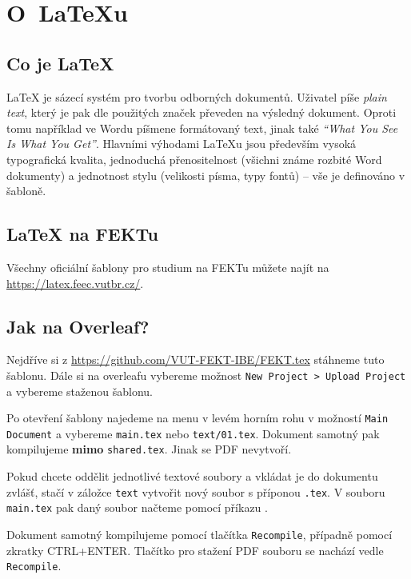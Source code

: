 \clearpage
\section[O~LaTeXu]{O~\LaTeX{}u}

\subsection{Co je \LaTeX}

\LaTeX{} je sázecí systém pro tvorbu odborných dokumentů.
Uživatel píše \emph{plain text}, který je pak dle použitých značek převeden na výsledný dokument.
Oproti tomu například ve Wordu píšmene formátovaný text, jinak také \emph{\enquote{What You See Is What You Get}}.
Hlavními výhodami \LaTeX{}u jsou především vysoká typografická kvalita, jednoduchá přenositelnost (všichni známe rozbité Word dokumenty) a jednotnost stylu (velikosti písma, typy fontů) -- vše je definováno v šabloně.

\subsection{LaTeX na FEKTu}

Všechny oficiální šablony pro studium na FEKTu můžete najít na 
\url{https://latex.feec.vutbr.cz/}.

\subsection{Jak na Overleaf?}

Nejdříve si z \url{https://github.com/VUT-FEKT-IBE/FEKT.tex}
stáhneme tuto šablonu.
Dále si na overleafu vybereme možnost \texttt{New Project > Upload Project} a vybereme staženou šablonu.

Po otevření šablony najedeme na menu v levém horním rohu v možností \texttt{Main Document} a vybereme \texttt{main.tex} nebo \texttt{text/01.tex}.
Dokument samotný pak kompilujeme \textbf{mimo} \texttt{shared.tex}.
Jinak se PDF nevytvoří.

Pokud chcete oddělit jednotlivé textové soubory a vkládat je do dokumentu zvlášť, stačí v záložce \texttt{text} vytvořit nový soubor s příponou \texttt{.tex}.
V souboru \texttt{main.tex} pak daný soubor načteme pomocí příkazu \verb||.

Dokument samotný kompilujeme pomocí tlačítka \texttt{Recompile}, případně pomocí zkratky CTRL+ENTER.
Tlačítko pro stažení PDF souboru se nachází vedle \texttt{Recompile}.


